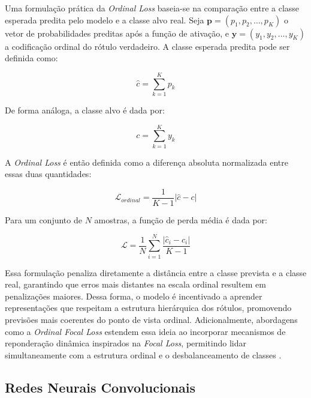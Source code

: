 Uma formulação prática da \textit{Ordinal Loss} baseia-se na comparação entre a classe esperada predita pelo modelo e a classe alvo real. Seja $\mathbf{p} = (p_1, p_2, \dots, p_K)$ o vetor de probabilidades preditas após a função de ativação, e $\mathbf{y} = (y_1, y_2, \dots, y_K)$ a codificação ordinal do rótulo verdadeiro. A classe esperada predita pode ser definida como:

\begin{equation}
	\hat{c} = \sum_{k=1}^{K} p_k
\end{equation}

De forma análoga, a classe alvo é dada por:

\begin{equation}
	c = \sum_{k=1}^{K} y_k
\end{equation}

A \textit{Ordinal Loss} é então definida como a diferença absoluta normalizada entre essas duas quantidades:

\begin{equation}
	\mathcal{L}_{ordinal} = \frac{1}{K - 1} \left| \hat{c} - c \right|
\end{equation}

Para um conjunto de $N$ amostras, a função de perda média é dada por:

\begin{equation}
	\mathcal{L} = \frac{1}{N} \sum_{i=1}^{N} \frac{\left| \hat{c}_i - c_i \right|}{K - 1}
	\label{eq:ordinal-loss}
\end{equation}

Essa formulação penaliza diretamente a distância entre a classe prevista e a classe real, garantindo que erros mais distantes na escala ordinal resultem em penalizações maiores. Dessa forma, o modelo é incentivado a aprender representações que respeitam a estrutura hierárquica dos rótulos, promovendo previsões mais coerentes do ponto de vista ordinal. Adicionalmente, abordagens como a \textit{Ordinal Focal Loss} estendem essa ideia ao incorporar mecanismos de reponderação dinâmica inspirados na \textit{Focal Loss}, permitindo lidar simultaneamente com a estrutura ordinal e o desbalanceamento de classes \cite{focal_loss_iot}.
	
\subsection{Redes Neurais Convolucionais}

